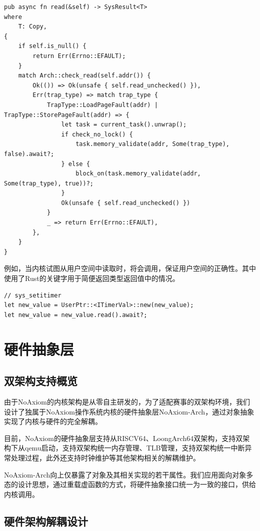 \documentclass{article}
\begin{document}
\begin{lstlisting}
pub async fn read(&self) -> SysResult<T>
where
    T: Copy,
{
    if self.is_null() {
        return Err(Errno::EFAULT);
    }
    match Arch::check_read(self.addr()) {
        Ok(()) => Ok(unsafe { self.read_unchecked() }),
        Err(trap_type) => match trap_type {
            TrapType::LoadPageFault(addr) | TrapType::StorePageFault(addr) => {
                let task = current_task().unwrap();
                if check_no_lock() {
                    task.memory_validate(addr, Some(trap_type), false).await?;
                } else {
                    block_on(task.memory_validate(addr, Some(trap_type), true))?;
                }
                Ok(unsafe { self.read_unchecked() })
            }
            _ => return Err(Errno::EFAULT),
        },
    }
}
\end{lstlisting}

例如，当内核试图从用户空间中读取时，将会调用，保证用户空间的正确性。其中使用了Rust的关键字用于简便返回类型返回值中的情况。

\begin{lstlisting}
// sys_setitimer
let new_value = UserPtr::<ITimerVal>::new(new_value);
let new_value = new_value.read().await?;
\end{lstlisting}

\newpage
\section{硬件抽象层}
\subsection{双架构支持概览}

由于NoAxiom的内核架构是从零自主研发的，为了适配赛事的双架构环境，我们设计了独属于NoAxiom操作系统内核的硬件抽象层NoAxiom-Arch，通过对象抽象实现了内核与硬件的完全解耦。

目前，NoAxiom的硬件抽象层支持从RISCV64、LoongArch64双架构，支持双架构下从qemu启动，支持双架构统一内存管理、TLB管理，支持双架构统一中断异常处理过程，此外还支持时钟维护等其他架构相关的解耦维护。

NoAxiom-Arch向上仅暴露了对象及其相关实现的若干属性。我们应用面向对象多态的设计思想，通过重载虚函数的方式，将硬件抽象接口统一为一致的接口，供给内核调用。

\subsection{硬件架构解耦设计}
\end{document}
